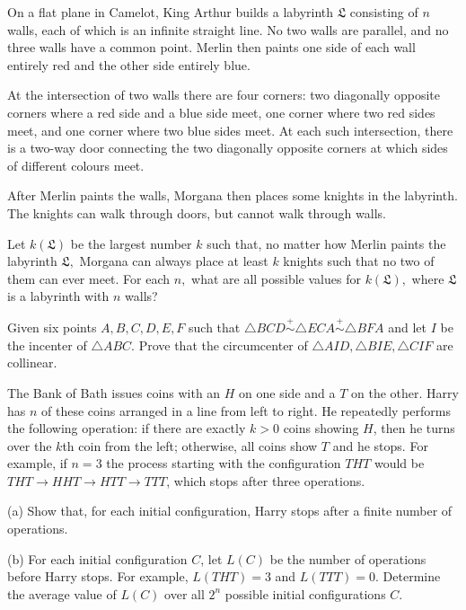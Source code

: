 \documentclass[11pt]{scrartcl}
\begin{document}
\begin{problem}[2252133047011954512]
On a flat plane in Camelot, King Arthur builds a labyrinth $\mathfrak{L}$ consisting of $n$ walls, each of which is an infinite straight line. No two walls are parallel, and no three walls have a common point. Merlin then paints one side of each wall entirely red and the other side entirely blue.

At the intersection of two walls there are four corners: two diagonally opposite corners where a red side and a blue side meet, one corner where two red sides meet, and one corner where two blue sides meet. At each such intersection, there is a two-way door connecting the two diagonally opposite corners at which sides of different colours meet.

After Merlin paints the walls, Morgana then places some knights in the labyrinth. The knights can walk through doors, but cannot walk through walls.

Let $k(\mathfrak{L})$ be the largest number $k$ such that, no matter how Merlin paints the labyrinth $\mathfrak{L},$ Morgana can always place at least $k$ knights such that no two of them can ever meet. For each $n,$ what are all possible values for $k(\mathfrak{L}),$ where $\mathfrak{L}$ is a labyrinth with $n$ walls?
\end{problem}
\begin{problem}[902621191535073]
Given six points $ A, B, C, D, E, F $ such that $ \triangle BCD \stackrel{+}{\sim} \triangle ECA \stackrel{+}{\sim} \triangle BFA $ and let $ I $ be the incenter of $ \triangle ABC. $ Prove that the circumcenter of $ \triangle AID, \triangle BIE, \triangle CIF $ are collinear.
\end{problem}
\begin{problem}[623590906176957]
	The Bank of Bath issues coins with an $H$ on one side and a $T$ on the other. Harry has $n$ of these coins arranged in a line from left to right. He repeatedly performs the following operation: if there are exactly $k>0$ coins showing $H$, then he turns over the $k$th coin from the left; otherwise, all coins show $T$ and he stops. For example, if $n=3$ the process starting with the configuration $THT$ would be $THT \to HHT  \to HTT \to TTT$, which stops after three operations.

(a) Show that, for each initial configuration, Harry stops after a finite number of operations.

(b) For each initial configuration $C$, let $L(C)$ be the number of operations before Harry stops. For example, $L(THT) = 3$ and $L(TTT) = 0$. Determine the average value of $L(C)$ over all $2^n$ possible initial configurations $C$.
\end{problem}
\end{document}
